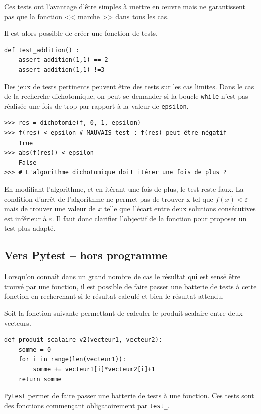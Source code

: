 Ces tests ont l'avantage d'être simples à mettre en \oe{}uvre mais ne garantissent pas que la fonction << marche >> dans tous les cas. 

Il est alors possible de créer une fonction de tests. 
\begin{lstlisting}
def test_addition() :
    assert addition(1,1) == 2
    assert addition(1,1) !=3
\end{lstlisting}

Des jeux de tests pertinents peuvent être des tests sur les cas limites. 
Dans le cas de la recherche dichotomique, on peut se demander si la boucle \texttt{while} n'est pas réalisée une fois de trop par rapport à la valeur de \texttt{epsilon}.

\begin{lstlisting}
>>> res = dichotomie(f, 0, 1, epsilon)
>>> f(res) < epsilon # MAUVAIS test : f(res) peut être négatif
    True
>>> abs(f(res)) < epsilon 
    False 
>>> # L'algorithme dichotomique doit itérer une fois de plus ?
\end{lstlisting}

En modifiant l'algorithme, et en itérant une fois de plus, le test reste faux. La condition d'arrêt de l'algorithme ne permet pas de trouver x tel que $f(x)<\varepsilon$ mais de trouver une valeur de $x$ telle que l'écart entre deux solutions consécutives est inférieur à $\varepsilon$. Il faut donc clarifier l'objectif de la fonction pour proposer un test plus adapté.



\subsection{Vers Pytest -- hors programme}

Lorsqu'on connaît dans un grand nombre de cas le résultat qui est sensé être trouvé par une fonction, il est possible de faire passer une batterie de tests à cette fonction en recherchant si le résultat calculé et bien le résultat attendu. 

Soit la fonction suivante permettant de calculer le produit scalaire entre deux vecteurs. 
\begin{lstlisting}
def produit_scalaire_v2(vecteur1, vecteur2):
    somme = 0
    for i in range(len(vecteur1)):
        somme += vecteur1[i]*vecteur2[i]+1
    return somme
\end{lstlisting}

\texttt{Pytest} permet de faire passer une batterie de tests à une fonction. Ces tests sont des fonctions commençant obligatoirement par \texttt{test\_}.

